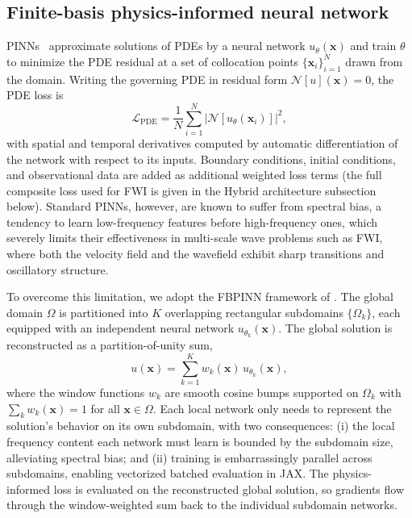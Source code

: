 \documentclass[11pt,a4paper]{article}
\begin{document}
\subsection{Finite-basis physics-informed neural network}
\label{sec:methods_fbpinn}

PINNs~\citep{RAISSI2019686} approximate solutions of PDEs by a neural network $u_\theta(\mathbf{x})$ and train $\theta$ to minimize the PDE residual at a set of collocation points $\{\mathbf{x}_i\}_{i=1}^{N}$ drawn from the domain. Writing the governing PDE in residual form $\mathcal{N}[u](\mathbf{x}) = 0$, the PDE loss is
\begin{equation}
    \mathcal{L}_\text{PDE}
    = \frac{1}{N} \sum_{i=1}^{N}
    \left| \mathcal{N}[u_\theta(\mathbf{x}_i)] \right|^{2},
\end{equation}
with spatial and temporal derivatives computed by automatic differentiation of the network with respect to its inputs. Boundary conditions, initial conditions, and observational data are added as additional weighted loss terms (the full composite loss used for FWI is given in the Hybrid architecture subsection below). Standard PINNs, however, are known to suffer from spectral bias, a tendency to learn low-frequency features before high-frequency ones, which severely limits their effectiveness in multi-scale wave problems such as FWI, where both the velocity field and the wavefield exhibit sharp transitions and oscillatory structure.

To overcome this limitation, we adopt the FBPINN framework of \citet{Moseley2023}. The global domain $\Omega$ is partitioned into $K$ overlapping rectangular subdomains $\{\Omega_k\}$, each equipped with an independent neural network $u_{\theta_k}(\mathbf{x})$. The global solution is reconstructed as a partition-of-unity sum,
\begin{equation}
    u(\mathbf{x}) = \sum_{k=1}^{K} w_k(\mathbf{x})\, u_{\theta_k}(\mathbf{x}),
\end{equation}
where the window functions $w_k$ are smooth cosine bumps supported on $\Omega_k$ with $\sum_k w_k(\mathbf{x}) = 1$ for all $\mathbf{x} \in \Omega$. Each local network only needs to represent the solution's behavior on its own subdomain, with two consequences: (i) the local frequency content each network must learn is bounded by the subdomain size, alleviating spectral bias; and (ii) training is embarrassingly parallel across subdomains, enabling vectorized batched evaluation in JAX. The physics-informed loss is evaluated on the reconstructed global solution, so gradients flow through the window-weighted sum back to the individual subdomain networks.
\end{document}
